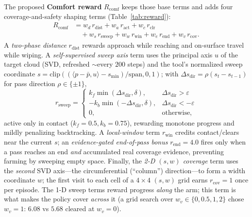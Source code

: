 \documentclass[conference]{IEEEtran}
\newcommand{\Rcomf}{R_{\mathrm{comf}}}
\begin{document}
The proposed \textbf{Comfort reward} $\Rcomf$ keeps those base terms and adds four
coverage-and-safety shaping terms (Table~\ref{tab:reward}):
\begin{align}
\Rcomf &= w_d\,r_{\text{dist}} + w_a\,r_{\text{act}} + w_c\,r_{\text{clr}} \nonumber\\
       &\quad + w_s\,r_{\text{sweep}} + w_w\,r_{\text{win}} + w_e\,r_{\text{end}} + w_v\,r_{\text{cov}}.
\label{eq:comf}
\end{align}
A \emph{two-phase distance} $r_{\text{dist}}$ rewards approach while reaching and on-surface
travel while wiping. A \emph{self-supervised sweep axis} term uses the principal axis $u$ of
the target cloud (SVD, refreshed ${\sim}$every $200$ steps) and the tool's normalized sweep
coordinate $s{=}\mathrm{clip}((\langle p{-}\bar p,u\rangle{-}s_{\min})/\mathrm{span},0,1)$;
with $\Delta s_{\text{dir}}{=}\rho(s_t{-}s_{t-1})$ for pass direction $\rho\in\{\pm1\}$,
\begin{equation}
r_{\text{sweep}}=
\begin{cases}
k_f\min(\Delta s_{\text{dir}},\delta), & \Delta s_{\text{dir}}>\varepsilon\\
-k_b\min(-\Delta s_{\text{dir}},\delta), & \Delta s_{\text{dir}}<-\varepsilon\\
0,& \text{otherwise,}
\end{cases}
\end{equation}
active only in contact ($k_f{=}0.5,k_b{=}0.75$), rewarding monotone progress and mildly
penalizing backtracking. A \emph{local-window} term $r_{\text{win}}$ credits contact/clears
near the current $s$; an \emph{evidence-gated end-of-pass bonus} $r_{\text{end}}{=}4.0$ fires
only when a pass reaches an end \emph{and} accumulated real coverage evidence, preventing
farming by sweeping empty space. Finally, the \emph{2-D $(s,w)$ coverage} term uses the
\emph{second} SVD axis---the circumferential (``column'') direction---to form a width
coordinate $w$; the first visit to each cell of a $4{\times}4$ $(s,w)$ grid earns
$r_{\text{cov}}{=}1$ once per episode. The 1-D sweep terms reward progress \emph{along} the
arm; this term is what makes the policy cover \emph{across} it (a grid search over
$w_v\in\{0,0.5,1,2\}$ chose $w_v{=}1$: $6.08$ vs $5.68$ cleared at $w_v{=}0$).
\end{document}
